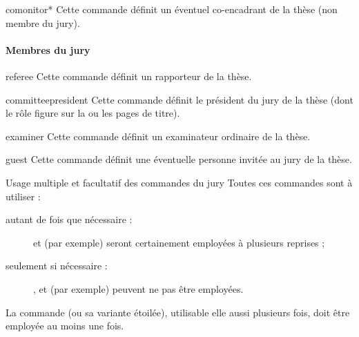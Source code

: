 \begin{docCommand}{comonitor*}{}
  Cette commande définit un éventuel co-encadrant de la thèse (non membre du jury).
\end{docCommand}

\paragraph{Membres du jury}\label{sec-definition-jury}
%
%

\begin{docCommand}{referee}{}
  Cette commande définit un rapporteur de la thèse.
\end{docCommand}

\begin{docCommand}{committeepresident}{}
  Cette commande définit le président du jury de la thèse (dont le rôle figure
  sur la ou les pages de titre).
\end{docCommand}

\begin{docCommand}{examiner}{}
  Cette commande définit un examinateur ordinaire de la thèse.
\end{docCommand}

\begin{docCommand}{guest}{}
  Cette commande définit une éventuelle personne invitée au jury de la thèse.
\end{docCommand}
%
\begin{dbwarning}{Usage multiple et facultatif des commandes du
    jury}{}
  Toutes ces commandes sont à utiliser :
  \begin{description}
  \item[autant de fois que nécessaire :]
     et  (par exemple) seront
    certainement employées à plusieurs reprises ;
  \item[seulement si nécessaire :]
    ,  et  (par
    exemple) peuvent ne pas être employées.
  \end{description}
  La commande  (ou sa variante étoilée), utilisable elle
  aussi plusieurs fois, doit être employée au moins une fois.
\end{dbwarning}

